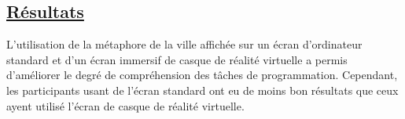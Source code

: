 \documentclass[a4paper,11pt,oneside]{article}
\begin{document}
\subsection{\ul{Résultats}}
    \par L'utilisation de la métaphore de la ville affichée sur un écran d'ordinateur standard et d'un écran immersif de casque de réalité virtuelle a permis
    d'améliorer le degré de compréhension des tâches de programmation. Cependant, les participants usant de l'écran standard ont eu de moins bon résultats que ceux ayent utilisé 
    l'écran de casque de réalité virtuelle.
\newpage


\end{document}
